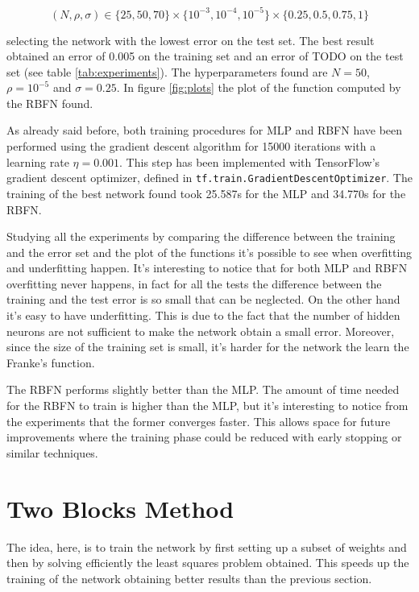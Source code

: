 \documentclass[a4paper]{article}
\numberwithin{equation}{section} %
\numberwithin{figure}{section} %
\numberwithin{table}{section} %
\theoremstyle{definition}
\begin{document}
\[ (N, \rho, \sigma) \in \Big\{25, 50, 70\Big\} \times \Big\{10^{-3}, 10^{-4}, 10^{-5}\Big\}
\times \Big\{0.25, 0.5, 0.75, 1\Big\} \]

\noindent selecting the network with the lowest error on the test set.
The best result obtained an error of 0.005 on the training set and an error of
TODO on the test set (see table \ref{tab:experiments}).
The hyperparameters found are $N=50$, $\rho=10^{-5}$ and $\sigma=0.25$. In figure \ref{fig:plots}
the plot of the function computed by the RBFN found.

As already said before, both training procedures for MLP and RBFN have been
performed using the gradient descent algorithm for 15000 iterations with a
learning rate $\eta = 0.001$. This step has been implemented with TensorFlow's
gradient descent optimizer, defined in \texttt{tf.train.GradientDescentOptimizer}.
The training of the best network found took 25.587s for the MLP and 34.770s for
the RBFN.

Studying all the experiments by comparing the difference between the training
and the error set and the plot of the functions it's possible to see when
overfitting and underfitting happen. It's interesting to notice that for both
MLP and RBFN overfitting never happens, in fact for all the tests the difference
between the training and the test error is so small that can be neglected.
On the other hand it's easy to have underfitting. This is due to the fact that
the number of hidden neurons are not sufficient to make the network obtain a
small error. Moreover, since the size of the training set is small, it's
harder for the network the learn the Franke's function.

The RBFN performs slightly better than the MLP. The amount of time needed for
the RBFN to train is higher than the MLP, but it's interesting to notice from the
experiments that the former converges faster. This allows space for future
improvements where the training phase could be reduced with early stopping or
similar techniques.


\section{Two Blocks Method}

The idea, here, is to train the network by first setting up a subset of weights
and then by solving efficiently the least squares problem obtained. This
speeds up the training of the network obtaining better results than the
previous section.
\end{document}
